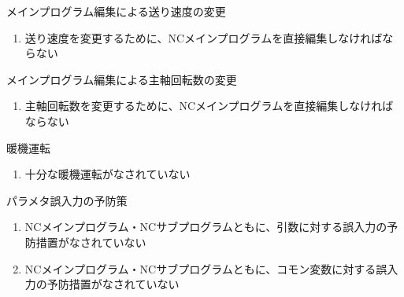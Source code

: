 \begin{Issues}{メインプログラム編集による送り速度の変更}
\begin{enumerate}[label=\sarrow]
\item[{\sarrow[red]}]送り速度を変更するために、NCメインプログラムを直接編集しなければならない
\end{enumerate}
\end{Issues}

\begin{Issues}{メインプログラム編集による主軸回転数の変更}
\begin{enumerate}[label=\sarrow]
\item[{\sarrow[red]}]主軸回転数を変更するために、NCメインプログラムを直接編集しなければならない
\end{enumerate}
\end{Issues}


\clearpage

\begin{Issues}{暖機運転}
\begin{enumerate}[label=\sarrow]
\item[{\sarrow[red]}]十分な暖機運転がなされていない
\end{enumerate}
\end{Issues}

\begin{Issues}{パラメタ誤入力の予防策}
\begin{enumerate}[label=\sarrow]
\item[{\sarrow[red]}]NCメインプログラム・NCサブプログラムともに、引数に対する誤入力の予防措置がなされていない
\item[{\sarrow[red]}]NCメインプログラム・NCサブプログラムともに、コモン変数に対する誤入力の予防措置がなされていない
\end{enumerate}
\end{Issues}

